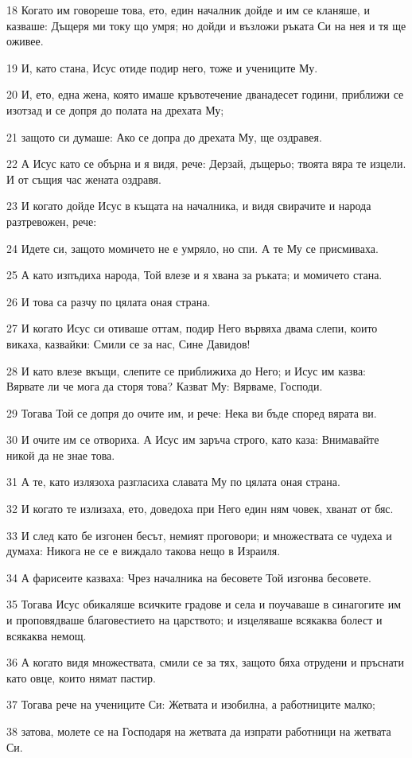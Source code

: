 \par 18 Когато им говореше това, ето, един началник дойде и им се кланяше, и казваше: Дъщеря ми току що умря; но дойди и възложи ръката Си на нея и тя ще оживее.
\par 19 И, като стана, Исус отиде подир него, тоже и учениците Му.
\par 20 И, ето, една жена, която имаше кръвотечение дванадесет години, приближи се изотзад и се допря до полата на дрехата Му;
\par 21 защото си думаше: Ако се допра до дрехата Му, ще оздравея.
\par 22 А Исус като се обърна и я видя, рече: Дерзай, дъщерьо; твоята вяра те изцели. И от същия час жената оздравя.
\par 23 И когато дойде Исус в къщата на началника, и видя свирачите и народа разтревожен, рече:
\par 24 Идете си, защото момичето не е умряло, но спи. А те Му се присмиваха.
\par 25 А като изпъдиха народа, Той влезе и я хвана за ръката; и момичето стана.
\par 26 И това са разчу по цялата оная страна.
\par 27 И когато Исус си отиваше оттам, подир Него вървяха двама слепи, които викаха, казвайки: Смили се за нас, Сине Давидов!
\par 28 И като влезе вкъщи, слепите се приближиха до Него; и Исус им казва: Вярвате ли че мога да сторя това? Казват Му: Вярваме, Господи.
\par 29 Тогава Той се допря до очите им, и рече: Нека ви бъде според вярата ви.
\par 30 И очите им се отвориха. А Исус им заръча строго, като каза: Внимавайте никой да не знае това.
\par 31 А те, като излязоха разгласиха славата Му по цялата оная страна.
\par 32 И когато те излизаха, ето, доведоха при Него един ням човек, хванат от бяс.
\par 33 И след като бе изгонен бесът, немият проговори; и множествата се чудеха и думаха: Никога не се е виждало такова нещо в Израиля.
\par 34 А фарисеите казваха: Чрез началника на бесовете Той изгонва бесовете.
\par 35 Тогава Исус обикаляше всичките градове и села и поучаваше в синагогите им и проповядваше благовестието на царството; и изцеляваше всякаква болест и всякаква немощ.
\par 36 А когато видя множествата, смили се за тях, защото бяха отрудени и пръснати като овце, които нямат пастир.
\par 37 Тогава рече на учениците Си: Жетвата и изобилна, а работниците малко;
\par 38 затова, молете се на Господаря на жетвата да изпрати работници на жетвата Си.

